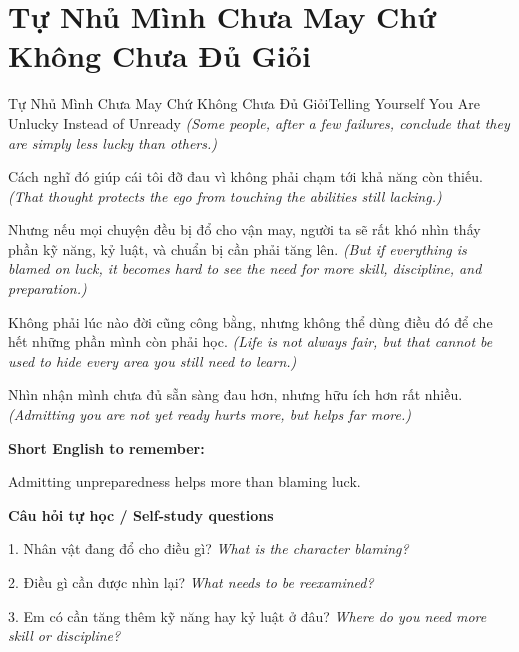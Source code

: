 \section{Tự Nhủ Mình Chưa May Chứ Không Chưa Đủ Giỏi}
\begin{truyen}{Tự Nhủ Mình Chưa May Chứ Không Chưa Đủ Giỏi}{Telling Yourself You Are Unlucky Instead of Unready}
\textit{(Some people, after a few failures, conclude that they are simply less lucky than others.)}

Cách nghĩ đó giúp cái tôi đỡ đau vì không phải chạm tới khả năng còn thiếu.
\textit{(That thought protects the ego from touching the abilities still lacking.)}

Nhưng nếu mọi chuyện đều bị đổ cho vận may, người ta sẽ rất khó nhìn thấy phần kỹ năng, kỷ luật, và chuẩn bị cần phải tăng lên.
\textit{(But if everything is blamed on luck, it becomes hard to see the need for more skill, discipline, and preparation.)}

Không phải lúc nào đời cũng công bằng, nhưng không thể dùng điều đó để che hết những phần mình còn phải học.
\textit{(Life is not always fair, but that cannot be used to hide every area you still need to learn.)}

\end{truyen}

\begin{baihoc}
Nhìn nhận mình chưa đủ sẵn sàng đau hơn, nhưng hữu ích hơn rất nhiều.
\textit{(Admitting you are not yet ready hurts more, but helps far more.)}
\end{baihoc}

\begin{ghinhoanh}
\textbf{Short English to remember:}

Admitting unpreparedness helps more than blaming luck.

\end{ghinhoanh}

\begin{tuhocnhanh}
\textbf{Câu hỏi tự học / Self-study questions}

1. Nhân vật đang đổ cho điều gì? \textit{What is the character blaming?}

2. Điều gì cần được nhìn lại? \textit{What needs to be reexamined?}

3. Em có cần tăng thêm kỹ năng hay kỷ luật ở đâu? \textit{Where do you need more skill or discipline?}
\end{tuhocnhanh}
\ngancach

